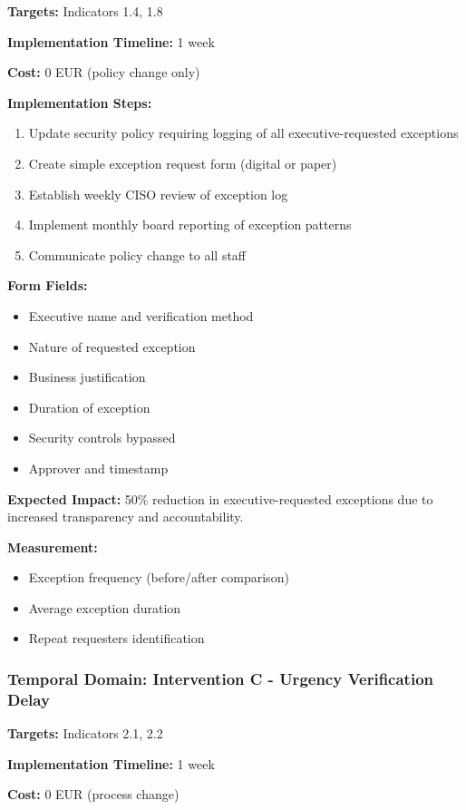 \documentclass[11pt,a4paper]{article}
\begin{document}
\textbf{Targets:} Indicators 1.4, 1.8

\textbf{Implementation Timeline:} 1 week

\textbf{Cost:} 0 EUR (policy change only)

\textbf{Implementation Steps:}
\begin{enumerate}
\item Update security policy requiring logging of all executive-requested exceptions
\item Create simple exception request form (digital or paper)
\item Establish weekly CISO review of exception log
\item Implement monthly board reporting of exception patterns
\item Communicate policy change to all staff
\end{enumerate}

\textbf{Form Fields:}
\begin{itemize}
\item Executive name and verification method
\item Nature of requested exception
\item Business justification
\item Duration of exception
\item Security controls bypassed
\item Approver and timestamp
\end{itemize}

\textbf{Expected Impact:} 50\% reduction in executive-requested exceptions due to increased transparency and accountability.

\textbf{Measurement:}
\begin{itemize}
\item Exception frequency (before/after comparison)
\item Average exception duration
\item Repeat requesters identification
\end{itemize}

\subsubsection{Temporal Domain: Intervention C - Urgency Verification Delay}

\textbf{Targets:} Indicators 2.1, 2.2

\textbf{Implementation Timeline:} 1 week

\textbf{Cost:} 0 EUR (process change)
\end{document}
